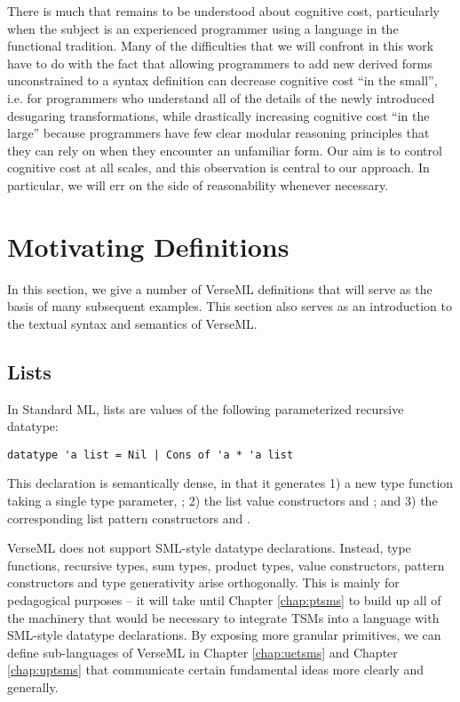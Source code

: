 There is much that remains to be understood about cognitive cost, particularly when the subject is an experienced programmer using a language in the functional tradition. Many of the difficulties that we will confront in this work have to do with the fact that allowing programmers to add new derived forms unconstrained to a syntax definition can decrease cognitive cost ``in the small'', i.e. for programmers who understand all of the details of the newly introduced desugaring transformations, while drastically increasing cognitive cost ``in the large'' because programmers have few clear modular reasoning principles that they can rely on when they encounter an unfamiliar form. Our aim is to control cognitive cost at all scales, and this observation is central to our approach. In particular, we will err on the side of reasonability whenever necessary. %



\section{Motivating Definitions}\label{sec:motivating-examples}
In this section, we give a number of VerseML definitions that will serve as the basis of many subsequent examples. This section also serves as an introduction to the textual syntax and semantics of VerseML.

\subsection{Lists}\label{sec:lists}
In Standard ML, lists are values of the following parameterized recursive datatype:
\begin{lstlisting}[numbers=none]
datatype 'a list = Nil | Cons of 'a * 'a list
\end{lstlisting}
This declaration is semantically dense, in that it generates 1) a new type function  taking a single type parameter, ; 2) the list value constructors  and ; and 3) the corresponding list pattern constructors  and .

VerseML does not support SML-style datatype declarations. Instead, type functions, recursive types, sum types, product types, value constructors, pattern constructors and type generativity arise orthogonally. This is mainly for pedagogical purposes -- it will take until Chapter \ref{chap:ptsms} to build up all of the machinery that would be necessary to integrate TSMs into a language with SML-style datatype declarations. By exposing more granular primitives, we can define sub-languages of VerseML in Chapter \ref{chap:uetsms} and Chapter \ref{chap:uptsms} that communicate certain fundamental ideas more clearly and generally.

